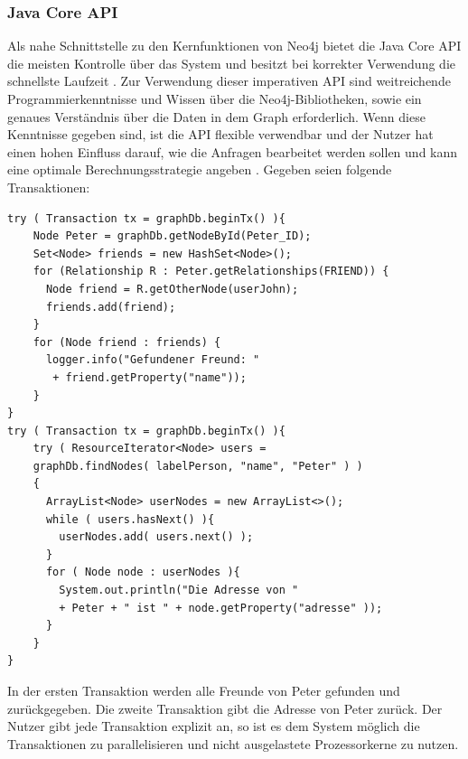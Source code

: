 \subsubsection{Java Core API}
Als nahe Schnittstelle zu den Kernfunktionen von Neo4j bietet die Java Core API die meisten Kontrolle über das System und besitzt bei korrekter Verwendung die schnellste Laufzeit \parencite{vukotic2015neo4j}. Zur Verwendung dieser imperativen API sind weitreichende Programmierkenntnisse und Wissen über die Neo4j-Bibliotheken, sowie ein genaues Verständnis  über die Daten in dem Graph erforderlich. Wenn diese Kenntnisse gegeben sind, ist die API flexible verwendbar  und der Nutzer hat einen hohen Einfluss darauf, wie die Anfragen bearbeitet werden sollen und kann eine optimale Berechnungsstrategie angeben \parencite{vukotic2015neo4j}. Gegeben seien folgende Transaktionen: \newline
\begin{Verbatim}[frame=single]
try ( Transaction tx = graphDb.beginTx() ){
	Node Peter = graphDb.getNodeById(Peter_ID);
	Set<Node> friends = new HashSet<Node>();
	for (Relationship R : Peter.getRelationships(FRIEND)) {  
	  Node friend = R.getOtherNode(userJohn);
	  friends.add(friend);
	}
	for (Node friend : friends) {
	  logger.info("Gefundener Freund: "
	   + friend.getProperty("name")); 
	}
}
try ( Transaction tx = graphDb.beginTx() ){
	try ( ResourceIterator<Node> users =
	graphDb.findNodes( labelPerson, "name", "Peter" ) )
	{
	  ArrayList<Node> userNodes = new ArrayList<>();
	  while ( users.hasNext() ){
		userNodes.add( users.next() );
	  }
	  for ( Node node : userNodes ){
		System.out.println("Die Adresse von " 
		+ Peter + " ist " + node.getProperty("adresse" ));
	  }
	}
}
\end{Verbatim}

\noindent In der ersten Transaktion werden alle Freunde von Peter gefunden und zurückgegeben. Die zweite Transaktion gibt die Adresse von  Peter zurück. Der Nutzer gibt jede Transaktion explizit an, so ist es dem System möglich die Transaktionen zu parallelisieren und nicht ausgelastete Prozessorkerne zu nutzen.

